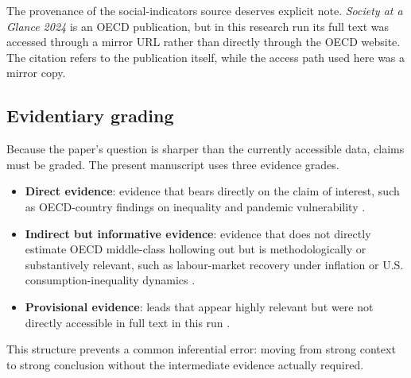 \documentclass[11pt]{article}
\begin{document}
The provenance of the social-indicators source deserves explicit note. \emph{Society at a Glance 2024} is an OECD publication, but in this research run its full text was accessed through a mirror URL rather than directly through the OECD website. The citation refers to the publication itself, while the access path used here was a mirror copy.

\subsection{Evidentiary grading}
Because the paper's question is sharper than the currently accessible data, claims must be graded. The present manuscript uses three evidence grades.

\begin{itemize}
\item \textbf{Direct evidence}: evidence that bears directly on the claim of interest, such as OECD-country findings on inequality and pandemic vulnerability \citep{covid19andincomein2021springer}.
\item \textbf{Indirect but informative evidence}: evidence that does not directly estimate OECD middle-class hollowing out but is methodologically or substantively relevant, such as labour-market recovery under inflation or U.S. consumption-inequality dynamics \citep{oecdemploymentoutl2024oecd,consumptioninequal2024bls}.
\item \textbf{Provisional evidence}: leads that appear highly relevant but were not directly accessible in full text in this run \citep{oecdeconomicsdepar2023one}.
\end{itemize}

This structure prevents a common inferential error: moving from strong context to strong conclusion without the intermediate evidence actually required.
\end{document}
